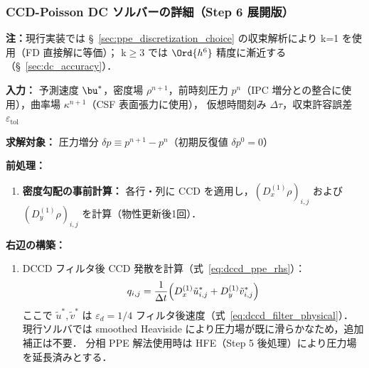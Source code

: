 \subsubsection{CCD-Poisson DC ソルバーの詳細（Step 6 展開版）}
\label{sec:algo_ppe_detail}

\noindent\textbf{注：}現行実装では §~\ref{sec:ppe_discretization_choice} の収束解析により k=1 を使用（FD 直接解に等価）；
k$\geq$3 では $\Ord{h^6}$ 精度に漸近する（§~\ref{sec:dc_accuracy}）．

\textbf{入力：} 予測速度 $\bu^*$，密度場 $\rho^{n+1}$，前時刻圧力 $p^n$（IPC 増分との整合に使用），曲率場 $\kappa^{n+1}$（CSF 表面張力に使用），
仮想時間刻み $\Delta\tau$，収束許容誤差 $\varepsilon_{\mathrm{tol}}$

\textbf{求解対象：} 圧力増分 $\delta p \equiv p^{n+1} - p^n$（初期反復値 $\delta p^0 = 0$）

\medskip
\textbf{前処理：}
\begin{enumerate}
  \item[(6.0)] \textbf{密度勾配の事前計算：}
  各行・列に CCD を適用し，$(D_x^{(1)}\rho)_{i,j}$ および $(D_y^{(1)}\rho)_{i,j}$ を計算（物性更新後1回）．
\end{enumerate}

\textbf{右辺の構築：}
\begin{enumerate}
  \item[(6.1)] DCCD フィルタ後 CCD 発散を計算（式~\eqref{eq:dccd_ppe_rhs}）：
  \[
    q_{i,j} = \frac{1}{\Delta t}\Bigl(D_x^{(1)}\tilde{u}^*_{i,j} + D_y^{(1)}\tilde{v}^*_{i,j}\Bigr)
  \]
  ここで $\tilde{u}^*, \tilde{v}^*$ は $\varepsilon_d=1/4$ フィルタ後速度（式~\eqref{eq:dccd_filter_physical}）．
  現行ソルバでは smoothed Heaviside により圧力場が既に滑らかなため，追加補正は不要．
  分相 PPE 解法使用時は HFE（Step 5 後処理）により圧力場を延長済みとする．
\end{enumerate}

